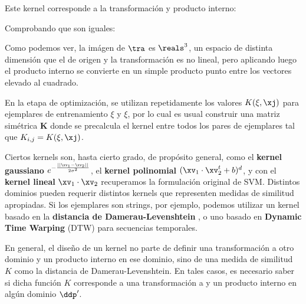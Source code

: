 Este kernel corresponde a la transformación y producto interno:


Comprobando que son iguales:


Como podemos ver, la imágen de $\tra$ es $\reals^3$, un espacio de distinta dimensión que el de origen y la transformación es no lineal, pero aplicando luego el producto interno se convierte en un simple producto punto entre los vectores elevado al cuadrado. 

En la etapa de optimización, se utilizan repetidamente los valores $K(\xi,\xj)$ para ejemplares de entrenamiento $\xi$ y $\xi$, por lo cual es usual construir una matriz simétrica $\mathbf{K}$ donde se precalcula el kernel entre todos los pares de ejemplares tal que $K_{i,j}= K(\xi,\xj)$.


Ciertos kernels son, hasta cierto grado, de propósito general, como el \textbf{kernel gaussiano} $e^{- \frac{|| \xv_1-\xv_2||}{2 \sigma^2} }$, el \textbf{kernel polinomial} $(\xv_1 \cdot \xv_2^t + b)^d$, y con el \textbf{kernel lineal} $\xv_1 \cdot \xv_2$ recuperamos la formulación original de SVM. Distintos dominios pueden requerir distintos kernels que representen medidas de similitud apropiadas. Si los ejemplares son strings, por ejemplo, podemos utilizar un kernel basado en la \textbf{distancia de Damerau-Levenshtein} \cite{Damerau1964}, o uno basado en \textbf{Dynamic Time Warping} (DTW) \cite{Bellman1959} para secuencias temporales.


En general, el diseño de un kernel no parte de definir una transformación a otro dominio y un producto interno en ese dominio, sino de una medida de similitud $K$ como la distancia de Damerau-Levenshtein. En tales casos, es necesario saber si dicha función $K$ corresponde a una transformación a y un producto interno en algún dominio $\ddp'$. 


